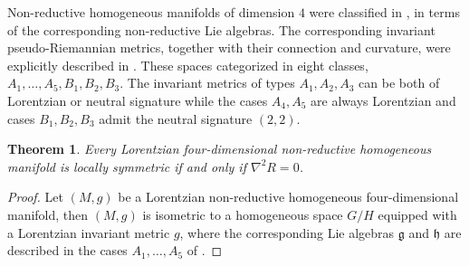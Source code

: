 \documentclass[11pt,oneside,leqno]{amsart}
\theoremstyle{plain}
\newtheorem{theorem}{Theorem}[section]
\begin{document}
Non-reductive homogeneous manifolds of dimension $4$ were classified in \cite{FR}, in terms of the corresponding non-reductive Lie algebras. The corresponding invariant pseudo-Riemannian metrics, together with their connection and curvature, were explicitly described in \cite{CF,CZ}. These spaces categorized in eight classes, $A_1,\dots,A_5,B_1,B_2,B_3$. The invariant metrics of types $A_1,A_2,A_3$ can be both of Lorentzian or neutral signature while the cases $A_4,A_5$ are always Lorentzian and cases $B_1,B_2,B_3$ admit the neutral signature $(2,2)$.

\begin{theorem}\label{thm2}
Every Lorentzian four-dimensional non-reductive homogeneous manifold is locally symmetric if and only if $\nabla^2 R=0$.
\end{theorem}
\begin{proof}
Let $(M,g)$ be a Lorentzian non-reductive homogeneous four-dimensional manifold, then $(M,g)$ is isometric to a homogeneous space $G/H$ equipped with a Lorentzian invariant metric $g$, where the corresponding Lie algebras ${{\mathfrak{g}}}$ and ${{\mathfrak{h}}}$ are described in the cases $A_1,\dots,A_5$ of \cite{CF}.


\end{proof}
\end{document}
